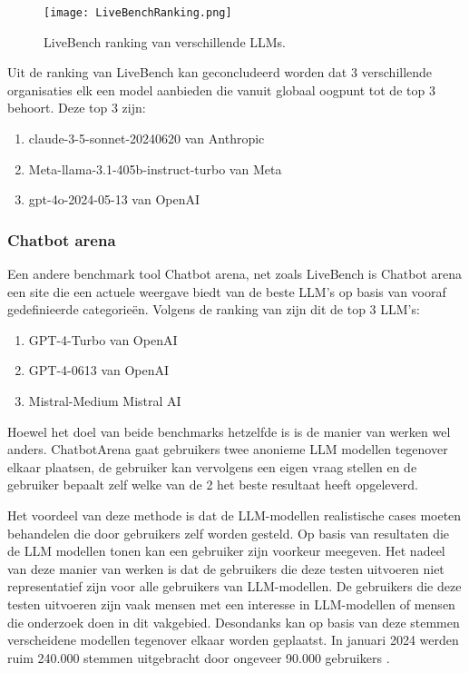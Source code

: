     \begin{figure}[H]
        \centering
        \texttt{[image: LiveBenchRanking.png]}
        \caption{LiveBench ranking van verschillende LLMs.}
        \label{fig:livebench}
    \end{figure}
    
    Uit de ranking van LiveBench kan geconcludeerd worden dat 3 verschillende organisaties elk een model aanbieden die vanuit globaal oogpunt tot de top 3 behoort. Deze top 3 zijn: 
    \begin{enumerate}
        \item claude-3-5-sonnet-20240620 van Anthropic
        \item Meta-llama-3.1-405b-instruct-turbo van Meta
        \item gpt-4o-2024-05-13 van OpenAI
    \end{enumerate}
    
    \subsubsection{Chatbot arena} 
    
    Een andere benchmark tool Chatbot arena, net zoals LiveBench is Chatbot arena een site die een actuele weergave biedt van de beste LLM's op basis van vooraf gedefinieerde categorieën. 
    Volgens de ranking van \textcite{LiveBench2025} zijn dit de top 3 LLM's:
    
    \begin{enumerate}
        \item GPT-4-Turbo van OpenAI
        \item GPT-4-0613 van OpenAI
        \item Mistral-Medium Mistral AI
    \end{enumerate}
    
    Hoewel het doel van beide benchmarks hetzelfde is is de manier van werken wel anders. ChatbotArena gaat gebruikers twee anonieme LLM modellen tegenover elkaar plaatsen, de gebruiker kan vervolgens een eigen vraag stellen en de gebruiker bepaalt zelf welke van de 2 het beste resultaat heeft opgeleverd.
    
    Het voordeel van deze methode is dat de LLM-modellen realistische cases moeten behandelen die door gebruikers zelf worden gesteld. Op basis van resultaten die de LLM modellen tonen kan een gebruiker zijn voorkeur meegeven. Het nadeel van deze manier van werken is dat de gebruikers die deze testen uitvoeren niet representatief zijn voor alle gebruikers van LLM-modellen. De gebruikers die deze testen uitvoeren zijn vaak mensen met een interesse in LLM-modellen of mensen die onderzoek doen in dit vakgebied. Desondanks kan op basis van deze stemmen verscheidene modellen tegenover elkaar worden geplaatst. In januari 2024 werden ruim 240.000 stemmen uitgebracht door ongeveer 90.000 gebruikers \autocite{chiang2024chatbotarenaopenplatform}. 
    
